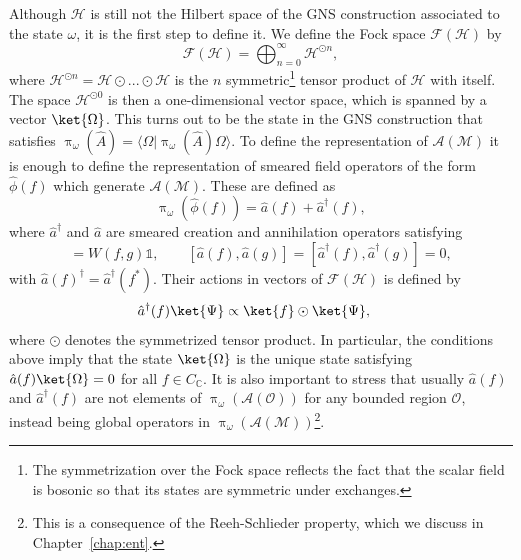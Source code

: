 \documentclass[letterpaper,12pt,titlepage,oneside,final]{book}
\newcommand{\openone}{\mathds{1}}
\newcommand{\M}{\mathcal{M}}
\begin{document}
Although $\mathscr{H}$ is still not the Hilbert space of the GNS construction associated to the state $\omega$, it is the first step to define it. We define the Fock space $\mathcal{F}(\mathscr{H})$ by
\begin{equation}\label{eq:Fock}
    \mathcal{F}(\mathscr{H}) = \bigoplus_{n=0}^\infty \mathscr{H}^{\odot n},
\end{equation}
where $\mathscr{H}^{\odot n} = \mathscr{H}\odot ...\odot \mathscr{H}$ is the $n$ symmetric\footnote{The symmetrization over the Fock space reflects the fact that the scalar field is bosonic so that its states are symmetric under exchanges.} tensor product of $\mathscr{H}$ with itself. The space $\mathscr{H}^{\odot 0}$ is then a one-dimensional vector space, which is spanned by a vector $\ket{\Omega}$. This turns out to be the state in the GNS construction that satisfies $\uppi_\omega(\hat{A}) = \langle \Omega | \uppi_\omega(\hat{A})\Omega\rangle$. To define the representation of $\mathcal{A}(\M)$ it is enough to define the representation of smeared field operators of the form $\hat{\phi}(f)$ which generate $\mathcal{A}(\M)$. These are defined as
\begin{equation}
    \uppi_\omega(\hat{\phi}(f)) = \hat{a}(f) + \hat{a}^\dagger(f),
\end{equation}
where $\hat{a}^\dagger$ and $\hat{a}$ are smeared creation and annihilation operators satisfying
\begin{equation}
    [\hat{a}(f),\hat{a}^\dagger(g)] = W(f,g) \openone, \quad\quad [\hat{a}(f),\hat{a}(g)] = [\hat{a}^\dagger(f),\hat{a}^\dagger(g)] = 0,
\end{equation}
with $\hat{a}(f)^\dagger = \hat{a}^\dagger(f^*)$. Their actions in vectors of $\mathcal{F}(\mathscr{H})$ is defined by 
\begin{align}
    \hat{a}^\dagger(f) \ket{\Psi} &\propto \ket{f}\odot \ket{\Psi},
\end{align}
where $\odot$ denotes the symmetrized tensor product. In particular, the conditions above imply that the state $\ket{\Omega}$ is the unique state satisfying $\hat{a}(f)\ket{\Omega} = 0$ for all $f\in C_{\mathbb{C}}$. It is also important to stress that usually $\hat{a}(f)$ and $\hat{a}^\dagger(f)$ are not elements of $\uppi_\omega(\mathcal{A}(\mathcal{O}))$ for any bounded region $\mathcal{O}$, instead being global operators in $\uppi_\omega(\mathcal{A}(\M))$\footnote{This is a consequence of the Reeh-Schlieder property, which we discuss in Chapter~\ref{chap:ent}.}.
\end{document}
